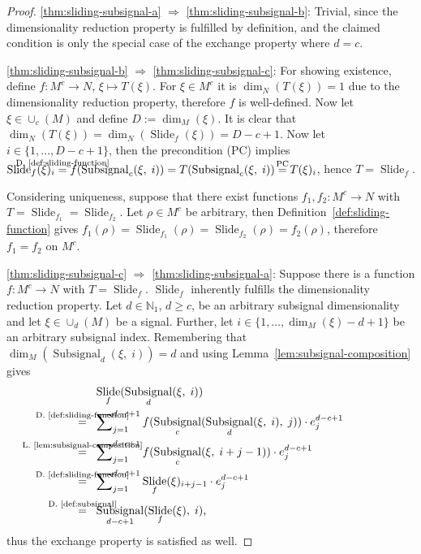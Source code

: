 \documentclass[journal]{IEEEtran}
\newcommand{\N}{\mathbb{N}}
\newcommand{\discint}[2]{\{#1,\dotsc,#2\}}
\newcommand{\inint}[2]{\in\discint{#1}{#2}}
\DeclareMathOperator{\Subsignal}{Subsignal}
\DeclareMathOperator{\Slide}{Slide}
\newcommand{\equsing}[1]{\overset{\mathclap{\text{#1}}}{=}}
\begin{document}
\begin{proof}
\ref{thm:sliding-subsignal-a} $\Rightarrow$ \ref{thm:sliding-subsignal-b}:
Trivial, since the dimensionality reduction property is fulfilled by definition, and the claimed condition is only the special case of the exchange property where $d = c$.

\ref{thm:sliding-subsignal-b} $\Rightarrow$ \ref{thm:sliding-subsignal-c}:
For showing existence, define $f\colon M^c\to N$, $\xi\mapsto T(\xi)$.
For $\xi\in M^c$ it is $\dim_N(T(\xi)) = 1$ due to the dimensionality reduction property, therefore $f$ is well-defined.
Now let $\xi\in\cup_c(M)$ and define $D := \dim_M(\xi)$.
It is clear that $\dim_N(T(\xi)) = \dim_N(\Slide_f(\xi)) = D - c + 1$.
Now let $i\inint{1}{D - c + 1}$, then the precondition (PC) implies
$\Slide_f(\xi)_i \equsing{D.~\ref{def:sliding-function}} f(\Subsignal_c(\xi,\;i)) = T(\Subsignal_c(\xi,\;i)) \equsing{PC} T(\xi)_i$,
hence $T = \Slide_f$.

Considering uniqueness, suppose that there exist functions $f_1,f_2\colon M^c\to N$ with $T = \Slide_{f_1} = \Slide_{f_2}$.
Let $\rho\in M^c$ be arbitrary, then Definition~\ref{def:sliding-function} gives $f_1(\rho) = \Slide_{f_1}(\rho) = \Slide_{f_2}(\rho) = f_2(\rho)$, therefore $f_1 = f_2$ on $M^c$.

\ref{thm:sliding-subsignal-c} $\Rightarrow$ \ref{thm:sliding-subsignal-a}:
Suppose there is a function $f\colon M^c\to N$ with $T = \Slide_f$.
$\Slide_f$ inherently fulfills the dimensionality reduction property.
Let $d\in\N_1$, $d\geq c$, be an arbitrary subsignal dimensionality and let $\xi\in\cup_d(M)$ be a signal.
Further, let $i\inint{1}{\dim_M(\xi) - d + 1}$ be an arbitrary subsignal index.
Remembering that $\dim_M(\Subsignal_d(\xi,\;i)) = d$ and using Lemma~\ref{lem:subsignal-composition} gives
\begin{align*}
       & \Slide_f(\Subsignal_d(\xi,\;i))\\
  \equsing{D.~\ref{def:sliding-function}}\ \ & \sum\nolimits_{j = 1}^{d - c + 1} f(\Subsignal_c(\Subsignal_d(\xi,\; i),\; j)) \cdot e_j^{d - c + 1}\\
  \equsing{L.~\ref{lem:subsignal-composition}}\ \ & \sum\nolimits_{j = 1}^{d - c + 1} f(\Subsignal_c(\xi,\; i + j - 1)) \cdot e_j^{d - c + 1}\\
  \equsing{D.~\ref{def:sliding-function}}\ \ & \sum\nolimits_{j = 1}^{d - c + 1} \Slide_f(\xi)_{i + j - 1} \cdot e_j^{d - c + 1}\\
  \equsing{D.~\ref{def:subsignal}}\ \ & \Subsignal_{d - c + 1}(\Slide_f(\xi),\;i)\text{,}
\end{align*}
thus the exchange property is satisfied as well.
\end{proof}
\end{document}
